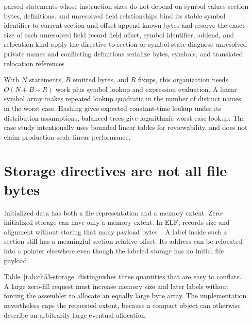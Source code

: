 \begin{algorithm}[htbp]
\caption{Read fixed-size assembly once while retaining symbolic fixups.}
\label{alg:ch53-fixups}
\begin{pseudocode}
\Require parsed statements whose instruction sizes do not depend on symbol values
\Ensure section bytes, definitions, and unresolved field relationships
    \State bind its stable symbol identifier to current section and offset
  \EndIf
    \State append known bytes and reserve the exact size of each unresolved field
    \State record field offset, symbol identifier, addend, and relocation kind
  \Else
    \State apply the directive to section or symbol state
  \EndIf
\EndFor
\State diagnose unresolved private names and conflicting definitions
\State serialize bytes, symbols, and translated relocation references
\end{pseudocode}
\end{algorithm}

With $N$ statements, $B$ emitted bytes, and $R$ fixups, this organization needs $O(N+B+R)$ work plus symbol lookup and expression evaluation.
A linear symbol array makes repeated lookup quadratic in the number of distinct names in the worst case.
Hashing gives expected constant-time lookup under its distribution assumptions; balanced trees give logarithmic worst-case lookup.
The case study intentionally uses bounded linear tables for reviewability, and does not claim production-scale linear performance.

\section{Storage directives are not all file bytes}
\label{sec:ch53-storage}

Initialized data has both a file representation and a memory extent.
Zero-initialized storage can have only a memory extent.
In ELF,  records size and alignment without storing that many payload bytes~\cite{xinuos-2026-elf}.
A label inside such a section still has a meaningful section-relative offset.
Its address can be relocated into a pointer elsewhere even though the labeled storage has no initial file payload.

Table~\ref{tab:ch53-storage} distinguishes three quantities that are easy to conflate.
A large zero-fill request must increase memory size and later labels without forcing the assembler to allocate an equally large byte array.
The implementation nevertheless caps the requested extent, because a compact object can otherwise describe an arbitrarily large eventual allocation.

